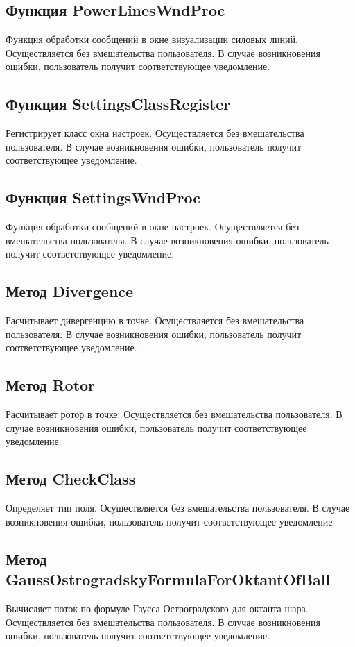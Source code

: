 \documentclass[14pt,a4paper,final]{extreport}
\begin{document}
\subsection{Функция PowerLinesWndProc}
Функция обработки сообщений в окне визуализации силовых линий. Осуществляется без вмешательства пользователя. 
В случае возникновения ошибки, пользователь получит соответствующее уведомление.

\subsection{Функция SettingsClassRegister}
Регистрирует класс окна настроек. Осуществляется без вмешательства пользователя. 
В случае возникновения ошибки, пользователь получит соответствующее уведомление.

\subsection{Функция SettingsWndProc}
Функция обработки сообщений в окне настроек. Осуществляется без вмешательства пользователя. 
В случае возникновения ошибки, пользователь получит соответствующее уведомление.

\subsection{Метод Divergence}
Расчитывает дивергенцию в точке. Осуществляется без вмешательства пользователя. 
В случае возникновения ошибки, пользователь получит соответствующее уведомление.

\subsection{Метод Rotor}
Расчитывает ротор в точке. Осуществляется без вмешательства пользователя. 
В случае возникновения ошибки, пользователь получит соответствующее уведомление.

\subsection{Метод CheckClass}
Определяет тип поля. Осуществляется без вмешательства пользователя. 
В случае возникновения ошибки, пользователь получит соответствующее уведомление.

\subsection{Метод GaussOstrogradskyFormulaForOktantOfBall}
Вычисляет поток по формуле Гаусса-Остроградского для октанта шара. Осуществляется без вмешательства пользователя. 
В случае возникновения ошибки, пользователь получит соответствующее уведомление.
\end{document}
